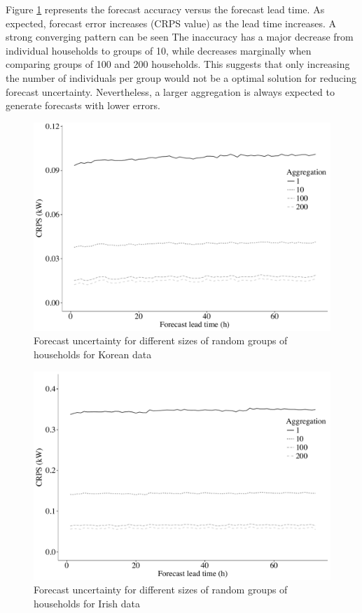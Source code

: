 \documentclass[preprint,3p,12pt,authoryear]{elsarticle}
\begin{document}
Figure \ref{fig:rndgrp} represents the forecast accuracy versus the forecast lead time.
As expected, forecast error increases (CRPS value) as the lead time increases.
A strong converging pattern can be seen
The inaccuracy has a major decrease from individual households to groups of 10, while decreases marginally when comparing groups of 100 and 200 households.
This suggests that only increasing the number of individuals per group would not be a optimal solution for reducing forecast uncertainty.
Nevertheless, a larger aggregation is always expected to generate forecasts with lower errors.

\begin{figure}
  \centering
  \includegraphics[width=0.8\columnwidth]{2017-10-13_rndgrp}
  \caption{Forecast uncertainty for different sizes of random groups of households for Korean data}
  \label{fig:rndgrp}
\end{figure}

\begin{figure}
  \centering
  \includegraphics[width=0.8\columnwidth]{2017-12-27_rndgrp_IR}
  \caption{Forecast uncertainty for different sizes of random groups of households for Irish data}
  \label{fig:rndgrpIR}
\end{figure}
\end{document}
